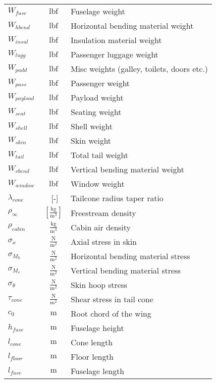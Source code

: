 \documentclass[12pt]{article}
\begin{document}
{\begin{supertabular}{lcl}
$W_{fuse}$ & $~\mathrm{lbf}$ & Fuselage weight \\
$W_{hbend}$ & $~\mathrm{lbf}$ & Horizontal bending material weight \\
$W_{insul}$ & $~\mathrm{lbf}$ & Insulation material weight \\
$W_{lugg}$ & $~\mathrm{lbf}$ & Passenger luggage weight \\
$W_{padd}$ & $~\mathrm{lbf}$ & Misc weights (galley, toilets, doors etc.) \\
$W_{pass}$ & $~\mathrm{lbf}$ & Passenger weight \\
$W_{payload}$ & $~\mathrm{lbf}$ & Payload weight \\
$W_{seat}$ & $~\mathrm{lbf}$ & Seating weight \\
$W_{shell}$ & $~\mathrm{lbf}$ & Shell weight \\
$W_{skin}$ & $~\mathrm{lbf}$ & Skin weight \\
$W_{tail}$ & $~\mathrm{lbf}$ & Total tail weight \\
$W_{vbend}$ & $~\mathrm{lbf}$ & Vertical bending material weight \\
$W_{window}$ & $~\mathrm{lbf}$ & Window weight \\
$\lambda_{cone}$ & $ $~[-]$ $ & Tailcone radius taper ratio \\
$\rho_{\infty}$ & $~\mathrm{[\tfrac{kg}{m^3}]}$ & Freestream density \\
$\rho_{cabin}$ & $~\mathrm{\tfrac{kg}{m^{3}}}$ & Cabin air density \\
$\sigma_x$ & $~\mathrm{\tfrac{N}{m^{2}}}$ & Axial stress in skin \\
$\sigma_{M_h}$ & $~\mathrm{\tfrac{N}{m^{2}}}$ & Horizontal bending material stress \\
$\sigma_{M_v}$ & $~\mathrm{\tfrac{N}{m^{2}}}$ & Vertical bending material stress \\
$\sigma_{\theta}$ & $~\mathrm{\tfrac{N}{m^{2}}}$ & Skin hoop stress \\
$\tau_{cone}$ & $~\mathrm{\tfrac{N}{m^{2}}}$ & Shear stress in tail cone \\
$c_0$ & $~\mathrm{m}$ & Root chord of the wing \\
$h_{fuse}$ & $~\mathrm{m}$ & Fuselage height \\
$l_{cone}$ & $~\mathrm{m}$ & Cone length \\
$l_{floor}$ & $~\mathrm{m}$ & Floor length \\
$l_{fuse}$ & $~\mathrm{m}$ & Fuselage length \\

\end{supertabular}}
\end{document}
